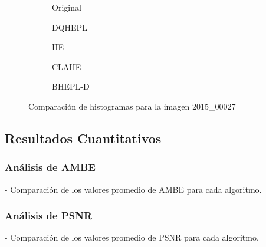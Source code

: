 \documentclass[sigchi]{acmart}
\begin{document}
\begin{figure}[H]
    \centering
    \begin{subfigure}[b]{0.45\textwidth}
        \resizebox{\linewidth}{!}{}
        \caption{Original}
        \label{fig:original_3}
    \end{subfigure}
    \hfill
    \begin{subfigure}[b]{0.45\textwidth}
        \resizebox{\linewidth}{!}{}
        \caption{DQHEPL}
        \label{fig:dqhepl_3}
    \end{subfigure}
    
    \vspace{5mm}
    
    \begin{subfigure}[b]{0.45\textwidth}
        \resizebox{\linewidth}{!}{}
        \caption{HE}
        \label{fig:he_3}
    \end{subfigure}
    \hfill
    \begin{subfigure}[b]{0.45\textwidth}
        \resizebox{\linewidth}{!}{}
        \caption{CLAHE}
        \label{fig:clahe_3}
    \end{subfigure}
    
    \vspace{5mm}
    
    \centering
    \begin{subfigure}[b]{0.45\textwidth}
        \resizebox{\linewidth}{!}{}
        \caption{BHEPL-D}
        \label{fig:bhepl_3}
    \end{subfigure}
    
    \caption{Comparación de histogramas para la imagen 2015\_00027}
    \label{fig:histogramas_3}
\end{figure}

\subsection{Resultados Cuantitativos}
\subsubsection{Análisis de AMBE}
- Comparación de los valores promedio de AMBE para cada algoritmo.

\subsubsection{Análisis de PSNR}
- Comparación de los valores promedio de PSNR para cada algoritmo.
\end{document}
